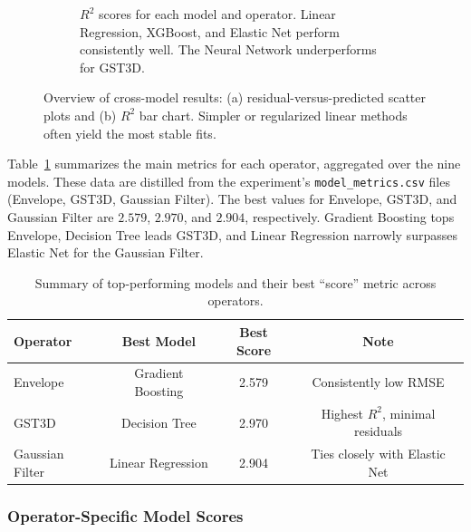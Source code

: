 \begin{figure}[htbp]
\begin{subfigure}[t]{0.49\textwidth}
        \caption{$R^2$ scores for each model and operator.
        Linear Regression, XGBoost, and Elastic Net perform consistently well.
        The Neural Network underperforms for \ac{GST3D}.}
    \end{subfigure}
    \caption{Overview of cross-model results: (a) residual-versus-predicted scatter plots and (b) $R^2$ bar chart.
    Simpler or regularized linear methods often yield the most stable fits.
    \label{fig:residual_vs_predicted_and_r2_bar}
    }
\end{figure}

Table~\ref{tab:performance_summary} summarizes the main metrics for each operator, aggregated over the nine models.
These data are distilled from the experiment’s \texttt{model\_metrics.csv} files (Envelope, \ac{GST3D}, Gaussian Filter).
The best  values for Envelope, \ac{GST3D}, and Gaussian Filter are $2.579$, $2.970$, and $2.904$, respectively.
Gradient Boosting tops Envelope, Decision Tree leads \ac{GST3D}, and Linear Regression narrowly surpasses Elastic Net for the Gaussian Filter.

\begin{table}[htbp]
    \centering
    \begin{tabular}{lccc}
        \hline
        \textbf{Operator} & \textbf{Best Model} & \textbf{Best Score} & \textbf{Note}                    \\
        \hline
        Envelope          & Gradient Boosting   & 2.579               & Consistently low RMSE            \\
        \ac{GST3D}        & Decision Tree       & 2.970               & Highest $R^2$, minimal residuals \\
        Gaussian Filter   & Linear Regression   & 2.904               & Ties closely with Elastic Net    \\
        \hline
    \end{tabular}
    \caption{Summary of top-performing models and their best “score” metric across operators.}
    \label{tab:performance_summary}
\end{table}

\subsubsection{Operator-Specific Model Scores}
\label{subsec:operator-specific-model-scores}

